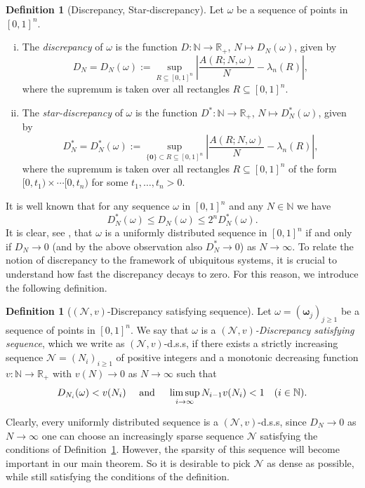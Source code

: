 \documentclass{amsart}
\theoremstyle{definition}
\newtheorem{definition}[theorem]{Definition}
\newcommand{\N}{\mathbb N}%
\newcommand{\R}{\mathbb R}
\newcommand{\0}{\mbf 0}%
\newcommand{\cN}{{\mathcal N}}
\renewcommand{\text}{\textup}
\def\N{\mathbb N}
\def\R{\mathbb R}
\begin{document}
\begin{definition}[Discrepancy, Star-discrepancy]
Let $\omega$ be a sequence of points in $[0,1]^n$.
\begin{enumerate}[i.]
    \item The \textit{discrepancy} of $\omega$ is the function $D:\N\to\R_+$, $N\mapsto D_N(\omega)$, given by
    \[
    D_N =
    D_N(\omega)
    :=
    \sup_{R\subseteq [0,1]^n}
    \left| \frac{A(R;N,\omega)}{N} - \lambda_n(R)\right|, 
    \]
    where the supremum is taken over all rectangles $R\subseteq [0,1]^{n}$.
    \item The \textit{star-discrepancy} of $\omega$ is the function $D^*:\N\to\R_+$, $N\mapsto D_N^*(\omega)$, given by
    \[
    D_N^* =
    D_N^*(\omega)
    :=
    \sup_{\{\boldsymbol{0}\}\subset R\subseteq [0,1]^n}
    \left| \frac{A(R;N,\omega)}{N} - \lambda_n(R)\right|, 
    \]
    where the supremum is taken over all rectangles $R\subseteq [0,1]^{n}$ of the form $[0,t_1)\times \cdots [0,t_n)$ for some $t_1,\ldots, t_n> 0$.
\end{enumerate}
\end{definition}
It is well known \cite[Theorem 1.3]{KuipersNiederreiter1974} that for any sequence $\omega$ in $[0,1]^n$ and any $N\in\N$ we have $$D_N^*(\omega)\leq D_N(\omega) \leq 2^n D_N^*(\omega).$$
It is clear, see \cite[Ch. 2 Example 1.2]{KuipersNiederreiter1974}, that $\omega$ is a uniformly distributed sequence in $[0,1]^{n}$ if and only if $D_{N}\to 0$ (and by the above observation also $D_{N}^{*}\to 0$) as $N\to \infty$. To relate the notion of discrepancy to the framework of ubiquitous systems, it is crucial to understand how fast the discrepancy decays to zero. For this reason, we introduce the following definition.
\begin{definition}[$(\cN,v)$-Discrepancy satisfying sequence] \label{d.s.s}
    Let $\omega =  (\boldsymbol{\omega}_{j})_{j\geq 1 }$ be a sequence of points in $[0,1]^{n}$. We say that $\omega$ is a \textit{$(\cN,v)$-Discrepancy satisfying sequence}, which we write as $(\cN,v)$-d.s.s, if there exists a strictly increasing sequence $\cN= (N_{i})_{i\geq 1}$ of positive integers and a monotonic decreasing function $v:\N\to \R_{+}$ with $v(N)\to 0$ as $N\to \infty$ such that
\begin{equation*}
    D_{N_{i}}(\omega)  < v(N_{i}) \quad \text{ and } \quad \limsup_{i\to\infty} N_{i-1}v(N_{i})< 1 \quad (i\in\N).
\end{equation*}
\end{definition}
Clearly, every uniformly distributed sequence is a $(\mathcal{N},v)$-d.s.s, since $D_{N}\to 0$ as $N\to \infty$ one can choose an increasingly sparse sequence $\cN$ satisfying the conditions of Definition~\ref{d.s.s}. However, the sparsity of this sequence will become important in our main theorem. So it is desirable to pick $\cN$ as dense as possible, while still satisfying the conditions of the definition. \par 
\end{document}

